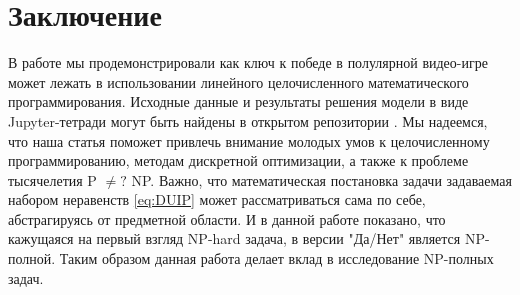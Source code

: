 \documentclass{article}
\begin{document}
\section{Заключение}
\label{SectionConclusion}
В работе мы продемонстрировали как ключ к победе в полулярной видео-игре может лежать в использовании линейного целочисленного математического программирования. 
Исходные данные и результаты решения модели в виде Jupyter-тетради могут быть найдены в открытом репозитории \cite{UnderLordsInput}.
Мы надеемся, что наша статья поможет привлечь внимание молодых умов к целочисленному программированию, методам дискретной оптимизации, а также к проблеме тысячелетия P $\neq ?$ NP. 
Важно, что математическая постановка задачи задаваемая набором неравенств \eqref{eq:DUIP} может  рассматриваться сама по себе, абстрагируясь от предметной области. И в данной работе показано, что кажущаяся на первый взгляд NP-hard задача, в версии "Да/Нет" является NP-полной. 
Таким образом данная работа делает вклад в исследование NP-полных задач. 



\end{document}
